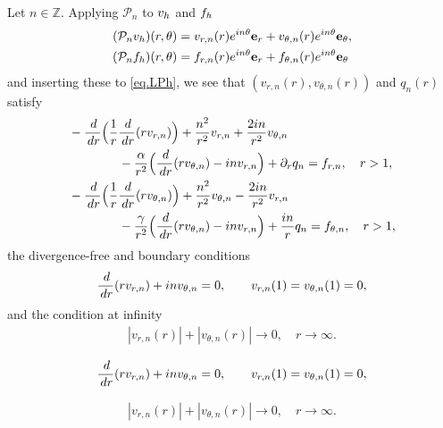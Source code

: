 \documentclass[10pt,a4paper]{amsart}
\newcommand{\Z}{\mathbb{Z}}
\newcommand{\dd}{\,{\rm d}}
\newcommand{\h}{{\rm h}}
\begin{document}
Let $n\in\Z$. Applying ${\mathcal P}_n$ to $v_\h$ and $f_\h$
%
\begin{align*}
({\mathcal P}_n v_\h)(r,\theta)
&= v_{r,n}(r) e^{in\theta} {\bf e}_r 
+ v_{\theta,n}(r) e^{in\theta} {\bf e}_\theta, \\
({\mathcal P}_n f_\h)(r,\theta)
&= f_{r,n}(r) e^{in\theta} {\bf e}_r 
+ f_{\theta,n}(r) e^{in\theta} {\bf e}_\theta 
\end{align*}
%
and inserting these to \eqref{eq.LPh}, we see that $(v_{r,n}(r),v_{\theta,n}(r))$ and $q_n(r)$ satisfy 
%
\begin{align}
&\begin{aligned}\label{eq.LPh.polar.vr}
&-\frac{\dd}{\dd r} \Big(\frac1r\frac{\dd}{\dd r} (r v_{r,n})\Big)
+ \frac{n^2}{r^2} v_{r,n}
+ \frac{2in}{r^2} v_{\theta,n} \\
&\qquad\qquad
- \frac{\alpha}{r^2} \Big(\frac{\dd}{\dd r} (r v_{\theta,n}) - in v_{r,n}\Big)
+ \partial_r q_n 
= f_{r,n}, \quad r>1, \\
\end{aligned} \\
&\begin{aligned}\label{eq.LPh.polar.vtheta}
&-\frac{\dd}{\dd r} \Big(\frac1r\frac{\dd}{\dd r} (r v_{\theta,n})\Big) 
+ \frac{n^2}{r^2} v_{\theta,n}
- \frac{2in}{r^2} v_{r,n} \\
&\qquad\qquad
- \frac{\gamma}{r^2} \Big(\frac{\dd}{\dd r} (r v_{\theta,n}) - in v_{r,n}\Big)
+ \frac{i n}{r} q_n 
= f_{\theta,n}, \quad r>1, 
\end{aligned}
\end{align}
%
the divergence-free and boundary conditions 
%
\begin{align}\label{eq.LPh.polar.div-free.bdry}
\frac{\dd}{\dd r}(r v_{r,n}) + in v_{\theta,n}=0, 
\qquad v_{r,n}(1)=v_{\theta,n}(1)=0, 
\end{align}
%
and the condition at infinity
%
\begin{align}\label{eq.LPh.polar.spatial.infinity}
|v_{r,n}(r)| + |v_{\theta,n}(r)| \to 0, \quad r\to\infty. 
\end{align}
%

\begin{align}
\frac{\dd}{\dd r}(r v_{r,n}) + in v_{\theta,n}=0, 
\qquad v_{r,n}(1)=v_{\theta,n}(1)=0, 
\end{align}

\begin{align}
|v_{r,n}(r)| + |v_{\theta,n}(r)| \to 0, \quad r\to\infty. 
\end{align}
\end{document}
